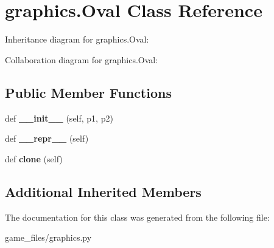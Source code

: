 \hypertarget{classgraphics_1_1Oval}{}\section{graphics.\+Oval Class Reference}
\label{classgraphics_1_1Oval}


Inheritance diagram for graphics.\+Oval\+:


Collaboration diagram for graphics.\+Oval\+:
\subsection*{Public Member Functions}
\begin{DoxyCompactItemize}
\item 
def {\bfseries \+\_\+\+\_\+init\+\_\+\+\_\+} (self, p1, p2)\hypertarget{classgraphics_1_1Oval_ac24c500a6feba342c3459fbfe5fee794}{}\label{classgraphics_1_1Oval_ac24c500a6feba342c3459fbfe5fee794}

\item 
def {\bfseries \+\_\+\+\_\+repr\+\_\+\+\_\+} (self)\hypertarget{classgraphics_1_1Oval_a7a3e92c1b76ffe75cbc18e49daa159ab}{}\label{classgraphics_1_1Oval_a7a3e92c1b76ffe75cbc18e49daa159ab}

\item 
def {\bfseries clone} (self)\hypertarget{classgraphics_1_1Oval_af914fb35dc36e36f1ba2f43679b8f0a1}{}\label{classgraphics_1_1Oval_af914fb35dc36e36f1ba2f43679b8f0a1}

\end{DoxyCompactItemize}
\subsection*{Additional Inherited Members}


The documentation for this class was generated from the following file\+:\begin{DoxyCompactItemize}
\item 
game\+\_\+files/graphics.\+py\end{DoxyCompactItemize}
